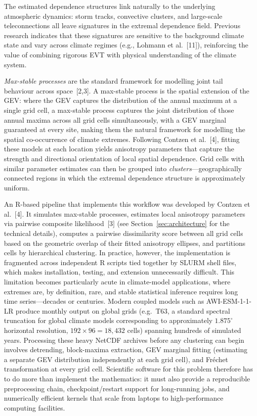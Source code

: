 \documentclass[preprint,12pt,a4paper]{elsarticle}
\newcommand{\rev}[1]{{#1}}
\newcommand{\revg}[1]{{\color{RevisionGreen}#1}}
\newcommand{\revo}[1]{{\color{RevisionOrange}#1}}
\newcommand{\revr}[1]{{\color{RevisionRed}#1}}
\begin{document}
\revg{The estimated dependence structures link naturally to the
underlying atmospheric dynamics: storm tracks, convective
clusters, and large-scale teleconnections all leave signatures
in the extremal dependence field. Previous research indicates
that these signatures are \revo{sensitive to the background
climate state} and vary across climate regimes (e.g., Lohmann
et al.~[11]), reinforcing the value of combining rigorous EVT
with physical understanding of the climate system.}

\emph{Max-stable processes} are the standard framework for
modelling joint tail behaviour across space~[2,3]. \revo{A
max-stable process is the spatial extension of the GEV: where
the GEV captures the distribution of the annual maximum at a
single grid cell, a max-stable process captures the joint
distribution of those annual maxima across all grid cells
simultaneously, with a GEV marginal guaranteed at every site,
making them the natural framework for modelling the spatial
co-occurrence of climate extremes.}
Following Contzen et al.~[4], fitting these models at each location
yields anisotropy parameters that capture the strength and
directional orientation of local spatial dependence.
Grid cells with similar parameter estimates can then be grouped
into \emph{clusters}---geographically connected regions in which
the extremal dependence structure is approximately uniform.

An R-based pipeline that implements this workflow was developed
by Contzen et al.~[4]. It simulates max-stable processes,
estimates local anisotropy parameters via pairwise composite
likelihood~[3] \revr{(see Section~\ref{sec:architecture} for the
technical details)}, computes a pairwise dissimilarity score between
all grid cells based on the geometric overlap of their fitted
anisotropy ellipses, and partitions cells by hierarchical clustering. In practice,
however, the implementation is fragmented across independent
R scripts tied together by SLURM shell files, which makes
installation, testing, and extension unnecessarily difficult.
\rev{This limitation becomes particularly acute in climate-model
applications, where extremes are, by definition, rare, and stable
statistical inference requires long time series---decades or
centuries. Modern coupled models such as AWI-ESM-1-1-LR produce
monthly output on global grids (e.g.\ T63\revo{, a standard
spectral truncation for global climate models corresponding to
approximately $1.875^{\circ}$ horizontal resolution,} $192 \times 96 =
18{,}432$ cells) spanning hundreds of simulated years.  Processing
these heavy NetCDF archives before any clustering can begin involves
detrending, block-maxima extraction, GEV marginal fitting (estimating
a separate GEV distribution independently at each grid cell), and
Fr\'{e}chet transformation at every grid cell.  Scientific software
for this problem therefore has to do more than implement the
mathematics: it must also provide a reproducible preprocessing chain,
checkpoint/restart support for long-running jobs, and numerically
efficient kernels that scale from laptops to high-performance
computing facilities.}
\end{document}
